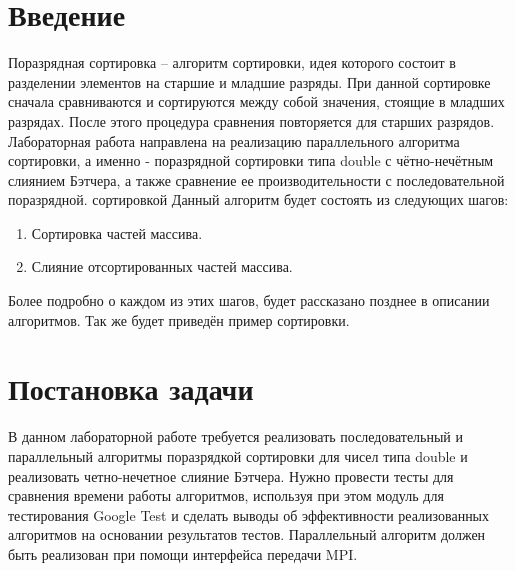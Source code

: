 \documentclass{report}
\begin{document}
\section*{Введение}
\par 
Поразрядная сортировка – алгоритм сортировки, идея которого состоит в разделении элементов на старшие и младшие разряды. При данной сортировке
сначала сравниваются и сортируются между собой значения, стоящие в младших разрядах. После этого процедура сравнения повторяется для старших разрядов.
Лабораторная работа направлена на реализацию параллельного алгоритма
сортировки, а именно - поразрядной сортировки типа double с чётно-нечётным слиянием Бэтчера, а также сравнение ее производительности с последовательной поразрядной. сортировкой
Данный алгоритм будет состоять из следующих шагов:
\begin{enumerate}
\item Сортировка частей массива.
\item Слияние отсортированных частей массива.
\end{enumerate}
Более подробно о каждом из этих шагов, будет рассказано позднее в описании
алгоритмов. Так же будет приведён пример сортировки.
\newpage
\section*{Постановка задачи}
\par В данном лабораторной работе требуется реализовать последовательный и параллельный алгоритмы поразрядкой сортировки для чисел типа double и реализовать четно-нечетное слияние Бэтчера. Нужно провести тесты для сравнения времени работы алгоритмов, используя при этом модуль для тестирования Google Test и сделать выводы об эффективности реализованных алгоритмов на основании результатов тестов.
Параллельный алгоритм должен быть реализован при помощи интерфейса передачи MPI.
\newpage
\end{document}
